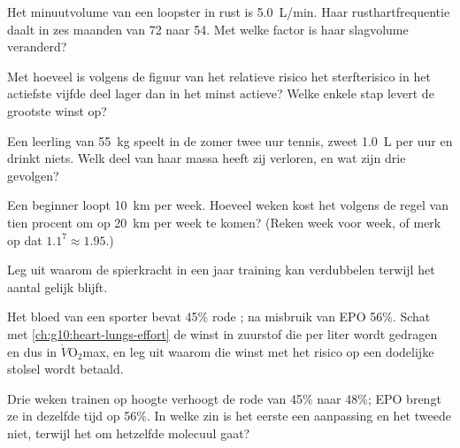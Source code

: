 \begin{exercise}[$\star\star$]\label{exo:g10:sport-and-health:7}
Het minuutvolume van een loopster in rust is \qty{5.0}{L/min}. Haar
rusthartfrequentie daalt in zes maanden van 72 naar 54. Met welke factor
is haar slagvolume veranderd?
\end{exercise}

\begin{exercise}[$\star\star$]\label{exo:g10:sport-and-health:8}
Met hoeveel is volgens de figuur van het relatieve risico het
sterfterisico in het actiefste vijfde deel lager dan in het minst
actieve? Welke enkele stap levert de grootste winst op?
\end{exercise}

\begin{exercise}[$\star\star$]\label{exo:g10:sport-and-health:9}
Een leerling van \qty{55}{kg} speelt in de zomer twee uur tennis, zweet
\qty{1.0}{L} per uur en drinkt niets. Welk deel van haar massa heeft zij
verloren, en wat zijn drie gevolgen?
\end{exercise}

\begin{exercise}[$\star\star$]\label{exo:g10:sport-and-health:10}
Een beginner loopt \qty{10}{km} per week. Hoeveel weken kost het volgens
de regel van tien procent om op \qty{20}{km} per week te komen? (Reken
week voor week, of merk op dat $1.1^7 \approx 1.95$.)
\end{exercise}

\begin{exercise}[$\star\star$]\label{exo:g10:sport-and-health:11}
Leg uit waarom de spierkracht in een jaar training kan verdubbelen
terwijl het aantal  gelijk blijft.
\end{exercise}

\begin{exercise}[$\star\star\star$]\label{exo:g10:sport-and-health:12}
Het bloed van een sporter bevat 45\% rode ; na misbruik van EPO
56\%. Schat met \cref{ch:g10:heart-lungs-effort} de winst in zuurstof
die per liter wordt gedragen en dus in $\dot V\!\mathrm{O_2}$max, en leg
uit waarom die winst met het risico op een dodelijke stolsel wordt
betaald.
\end{exercise}

\begin{exercise}[$\star\star\star$]\label{exo:g10:sport-and-health:13}
Drie weken trainen op hoogte verhoogt de rode  van 45\% naar 48\%;
EPO brengt ze in dezelfde tijd op 56\%. In welke zin is het eerste een
aanpassing en het tweede niet, terwijl het om hetzelfde molecuul gaat?
\end{exercise}

